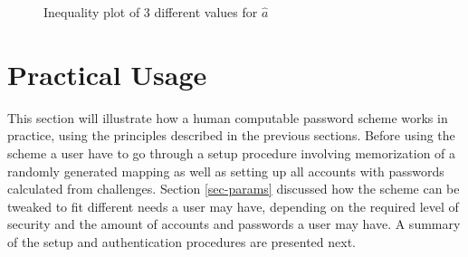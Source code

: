 \begin{figure}
\caption{Inequality plot of 3 different values for $\hat a$}
\label{a-var}
\end{figure}





\section{Practical Usage}\label{usage}
This section will illustrate how a human computable password scheme works in practice, using the principles described in the previous sections. Before using the scheme a user have to go through a setup procedure involving memorization of a randomly generated mapping as well as setting up all accounts with passwords calculated from challenges. Section \ref{sec-params} discussed how the scheme can be tweaked to fit different needs a user may have, depending on the required level of security and the amount of accounts and passwords a user may have. A summary of the setup and authentication procedures are presented next.
